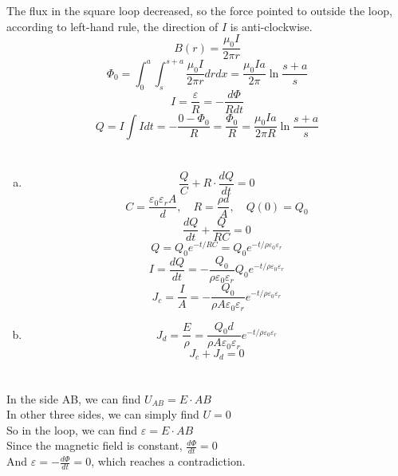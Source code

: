 \documentclass{article}
\begin{document}
\section{}
The flux in the square loop decreased, so the force pointed to outside the loop, according to left-hand rule, the direction of $I$ is anti-clockwise.
$$B(r)=\frac{\mu_0 I}{2\pi r}$$
$$\Phi_0=\int_0^a\int_s^{s+a}\frac{\mu_0 I}{2\pi r}drdx=\frac{\mu_0 Ia}{2\pi}\ln\frac{s+a}{s}$$
$$I=\frac{\varepsilon}{R}=-\frac{d\Phi}{Rdt}$$
$$Q=I\int Idt=-\frac{0-\Phi_0}{R}=\frac{\Phi_0}{R}=\frac{\mu_0 Ia}{2\pi R}\ln\frac{s+a}{s}$$

\section{}
\begin{enumerate}[(a)]
\item
$$\frac{Q}{C}+R\cdot\frac{dQ}{dt}=0$$
$$C=\frac{\varepsilon_0\varepsilon_rA}{d},\quad R=\frac{\rho d}{A},\quad Q(0)=Q_0$$
$$\frac{dQ}{dt}+\frac{Q}{RC}=0$$
$$Q=Q_0e^{-t/RC}=Q_0e^{-t/\rho\varepsilon_0\varepsilon_r}$$
$$I=\frac{dQ}{dt}=-\frac{Q_0}{\rho\varepsilon_0\varepsilon_r}Q_0e^{-t/\rho\varepsilon_0\varepsilon_r}$$
$$J_c=\frac{I}{A}=-\frac{Q_0}{\rho A\varepsilon_0\varepsilon_r}e^{-t/\rho\varepsilon_0\varepsilon_r}$$
\item
$$J_d=\frac{E}{\rho}=\frac{Q_0d}{\rho A\varepsilon_0\varepsilon_r}e^{-t/\rho\varepsilon_0\varepsilon_r}$$
$$J_c+J_d=0$$
\end{enumerate}

\section{}
In the side AB, we can find $U_{AB}=E\cdot AB$\\
In other three sides, we can simply find $U=0$\\
So in the loop, we can find $\varepsilon=E\cdot AB$\\
Since the magnetic field is constant, $\frac{d\Phi}{dt}=0$\\
And $\varepsilon=-\frac{d\Phi}{dt}=0$, which reaches a contradiction.
\end{document}
